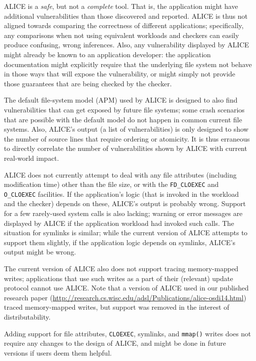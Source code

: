 \documentclass[oneside]{memoir}
\begin{document}
ALICE is a \textit{safe}, but not a \textit{complete} tool. That is, the application might have additional vulnerabilities than those discovered and reported. ALICE is thus not aligned towards comparing the correctness of different applications; specifically, any comparisons when not using equivalent workloads and checkers can easily produce confusing, wrong inferences. Also, any vulnerability displayed by ALICE might already be known to an application developer: the application documentation might explicitly require that the underlying file system not behave in those ways that will expose the vulnerability, or might simply not provide those guarantees that are being checked by the checker.

The default file-system model (APM) used by ALICE is designed to also find vulnerabilities that can get exposed by future file systems; some crash scenarios that are possible with the default model do not happen in common current file systems. Also, ALICE's output (a list of vulnerabilities) is only designed to show the number of source lines that require ordering or atomicity. It is thus erraneous to directly correlate the number of vulnerabilities shown by ALICE with current real-world impact.

ALICE does not currently attempt to deal with any file attributes (including modification time) other than the file size, or with the \verb;FD_CLOEXEC; and \verb;O_CLOEXEC; facilities. If the application's logic (that is invoked in the workload and the checker) depends on these, ALICE's output is probably wrong. Support for a few rarely-used system calls is also lacking; warning or error messages are displayed by ALICE if the application workload had invoked such calls. The situation for symlinks is similar; while the current version of ALICE attempts to support them slightly, if the application logic depends on symlinks, ALICE's output might be wrong.

The current version of ALICE also does not support tracing memory-mapped writes; applications that use such writes as a part of their (relevant) update protocol cannot use ALICE. Note that a version of ALICE used in our published research paper (\url{http://research.cs.wisc.edu/adsl/Publications/alice-osdi14.html}) traced memory-mapped writes, but support was removed in the interest of distributability.

Adding support for file attributes, \verb;CLOEXEC;, symlinks, and \verb;mmap(); writes does not require any changes to the design of ALICE, and might be done in future versions if users deem them helpful.
\end{document}
